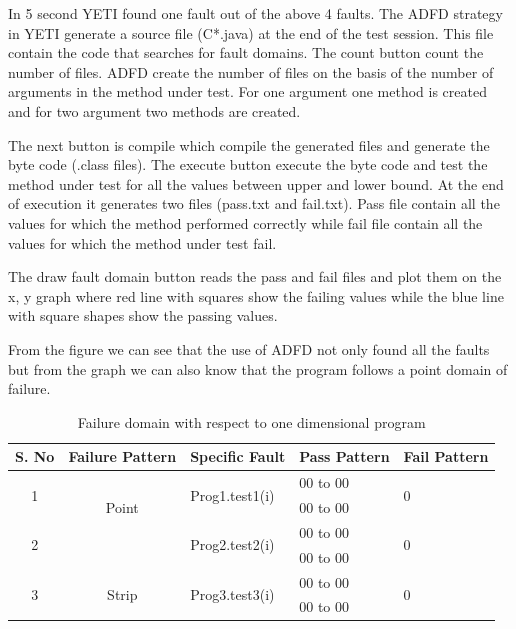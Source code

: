 \documentclass{acm_proc_article-sp}
\begin{document}
In 5 second YETI found one fault out of the above 4 faults. The ADFD strategy in YETI generate a source file (C*.java) at the end of the test session. This file contain the code that searches for fault domains. The count button count the number of files. ADFD create the number of files on the basis of the number of arguments in the method under test. For one argument one method is created and for two argument two methods are created. 

The next button is compile which compile the generated files and generate the byte code (.class files). The execute button execute the byte code and test the method under test for all the values between upper and lower bound. At the end of execution it generates two files (pass.txt and fail.txt). Pass file contain all the values for which the method performed correctly while fail file contain all the values for which the method under test fail.

The draw fault domain button reads the pass and fail files and plot them on the x, y graph where red line with squares show the failing values while the blue line with square shapes show the passing values.

From the figure {} we can see that the use of ADFD not only found all the faults but from the graph we can also know that the program follows a point domain of failure.

\begin{table}[t]
\centering

\begin{tabular}{|c|c|l|l|l|}

\hline 

\textbf{S. No}		& \textbf{Failure Pattern}	& \textbf{Specific Fault}	 		& \textbf{Pass Pattern} 			& \textbf{Fail Pattern} 			\\ \hline 


\multirow{2}{*}{1} 	&\multirow{3}{*}{Point}	&\multirow{2}{*}{Prog1.test1(i)}	& 00 to 00				&\multirow{2}{*}{0}	  			\\ \cline{4-4} 
				&					&							&00 to 00				&	                           			\\ \cline{3-5} \hline
\multirow{2}{*}{2} 	&\multirow{3}{*}{Block}	&\multirow{2}{*}{Prog2.test2(i)}	&00 to 00				&\multirow{2}{*}{0}	  			\\ \cline{4-4} 
				&					&							&00 to 00				&	                           			\\ \cline{3-5} \hline
\multirow{2}{*}{3} 	&\multirow{3}{*}{Strip}	&\multirow{2}{*}{Prog3.test3(i)}	&00 to 00				&\multirow{2}{*}{0}	  			\\ \cline{4-4} 
				&					&							&00 to 00				&	                           			\\ \cline{3-5} \hline
\end{tabular}
\caption{Failure domain with respect to one dimensional program}
\label{tb:failtable}
\end{table}
\end{document}
